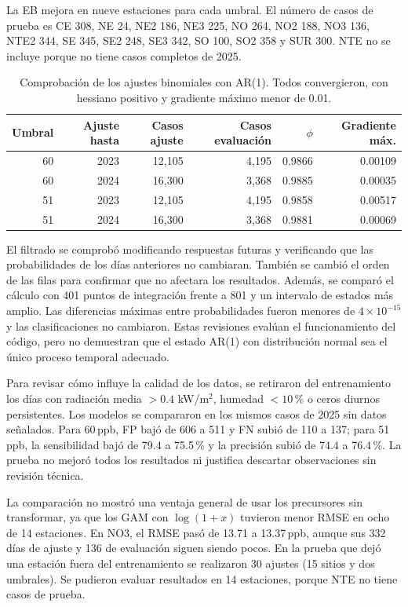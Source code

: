 \documentclass[11pt,letterpaper]{article}
\newcommand{\ppb}{\,ppb}
\begin{document}
La EB mejora en nueve estaciones para cada umbral. El número de casos de prueba es CE 308, NE 24, NE2 186, NE3 225, NO 264, NO2 188, NO3 136, NTE2 344, SE 345, SE2 248, SE3 342, SO 100, SO2 358 y SUR 300. NTE no se incluye porque no tiene casos completos de 2025.

\begin{table}[!htbp]\centering\small
\begin{tabular}{@{}rrrrrr@{}}\toprule
Umbral & Ajuste hasta & Casos ajuste & Casos evaluación & $\phi$ & Gradiente máx.\\\midrule
60 & 2023 & 12,105 & 4,195 & 0.9866 & 0.00109\\
60 & 2024 & 16,300 & 3,368 & 0.9885 & 0.00035\\
51 & 2023 & 12,105 & 4,195 & 0.9858 & 0.00517\\
51 & 2024 & 16,300 & 3,368 & 0.9881 & 0.00069\\\bottomrule
\end{tabular}
\caption{Comprobación de los ajustes binomiales con AR(1). Todos convergieron, con hessiano positivo y gradiente máximo menor de 0.01.}\label{tab:controlar1}
\end{table}

El filtrado se comprobó modificando respuestas futuras y verificando que las probabilidades de los días anteriores no cambiaran. También se cambió el orden de las filas para confirmar que no afectara los resultados. Además, se comparó el cálculo con 401 puntos de integración frente a 801 y un intervalo de estados más amplio. Las diferencias máximas entre probabilidades fueron menores de $4\times10^{-15}$ y las clasificaciones no cambiaron. Estas revisiones evalúan el funcionamiento del código, pero no demuestran que el estado AR(1) con distribución normal sea el único proceso temporal adecuado.

Para revisar cómo influye la calidad de los datos, se retiraron del entrenamiento los días con radiación media $>0.4$ kW/m$^2$, humedad $<10$\,\% o ceros diurnos persistentes. Los modelos se compararon en los mismos casos de 2025 sin datos señalados. Para 60\ppb, FP bajó de 606 a 511 y FN subió de 110 a 137; para 51\ppb, la sensibilidad bajó de 79.4 a 75.5\,\% y la precisión subió de 74.4 a 76.4\,\%. La prueba no mejoró todos los resultados ni justifica descartar observaciones sin revisión técnica.

La comparación no mostró una ventaja general de usar los precursores sin transformar, ya que los GAM con $\log(1+x)$ tuvieron menor RMSE en ocho de 14 estaciones. En NO3, el RMSE pasó de 13.71 a 13.37\ppb, aunque sus 332 días de ajuste y 136 de evaluación siguen siendo pocos. En la prueba que dejó una estación fuera del entrenamiento se realizaron 30 ajustes (15 sitios y dos umbrales). Se pudieron evaluar resultados en 14 estaciones, porque NTE no tiene casos de prueba.
\clearpage
\end{document}
